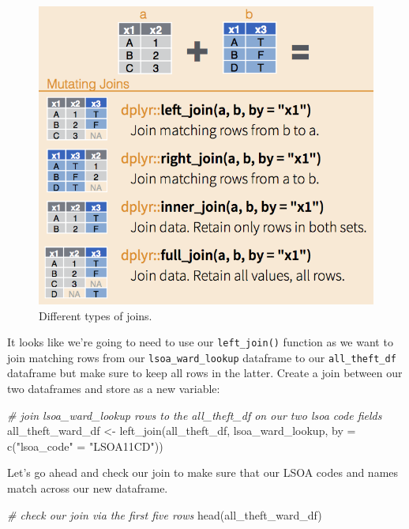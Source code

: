 \documentclass[
]{book}
\newenvironment{Shaded}{\begin{snugshade}}{\end{snugshade}}
\newcommand{\AttributeTok}[1]{\textcolor[rgb]{0.77,0.63,0.00}{#1}}
\newcommand{\CommentTok}[1]{\textcolor[rgb]{0.56,0.35,0.01}{\textit{#1}}}
\newcommand{\FunctionTok}[1]{\textcolor[rgb]{0.00,0.00,0.00}{#1}}
\newcommand{\NormalTok}[1]{#1}
\newcommand{\OtherTok}[1]{\textcolor[rgb]{0.56,0.35,0.01}{#1}}
\newcommand{\StringTok}[1]{\textcolor[rgb]{0.31,0.60,0.02}{#1}}
\begin{document}
\begin{figure}

{\centering \includegraphics[width=0.9\linewidth]{images/w05/dplyr-joins} 

}

\caption{Different types of joins.}\label{fig:05-dplyr}
\end{figure}

It looks like we're going to need to use our \texttt{left\_join()} function as we want to join matching rows from our \texttt{lsoa\_ward\_lookup} dataframe to our \texttt{all\_theft\_df} dataframe but make sure to keep all rows in the latter. Create a join between our two dataframes and store as a new variable:

\begin{Shaded}
\begin{Highlighting}[]
\CommentTok{\# join lsoa\_ward\_lookup rows to the all\_theft\_df on our two lsoa code fields}
\NormalTok{all\_theft\_ward\_df }\OtherTok{\textless{}{-}} \FunctionTok{left\_join}\NormalTok{(all\_theft\_df, lsoa\_ward\_lookup, }\AttributeTok{by =} \FunctionTok{c}\NormalTok{(}\StringTok{"lsoa\_code"} \OtherTok{=} \StringTok{"LSOA11CD"}\NormalTok{))}
\end{Highlighting}
\end{Shaded}

Let's go ahead and check our join to make sure that our LSOA codes and names match across our new dataframe.

\begin{Shaded}
\begin{Highlighting}[]
\CommentTok{\# check our join via the first five rows}
\FunctionTok{head}\NormalTok{(all\_theft\_ward\_df)}
\end{Highlighting}
\end{Shaded}
\end{document}
